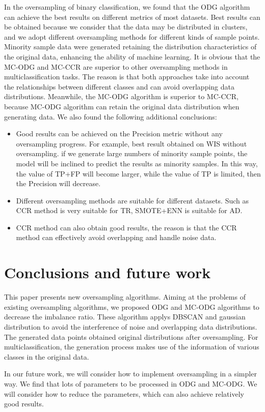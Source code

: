 \documentclass[ida]{iosart2x}
\begin{document}
In the oversampling of binary classification, 
we found that the ODG algorithm can achieve the best 
results on different metrics of most datasets.
Best results can be obtained because we consider 
that the data may be distributed in clusters, 
and we adopt different oversampling methods for different kinds of sample points.
Minority sample data were generated retaining 
the distribution characteristics of the original data, 
enhancing the ability of machine learning.
It is obvious that the MC-ODG and MC-CCR are superior 
to other oversampling methods in  
multiclassification tasks. 
The reason is that both approaches take into account 
the relationships between different classes and
can avoid overlapping data distributions.
Meanwhile, the MC-ODG algorithm is superior to MC-CCR, because MC-ODG
algorithm can retain the original data distribution when generating data.
We also found the following additional conclusions:
\begin{itemize}
  \item Good results can be achieved on the Precision metric without any oversampling progress. 
  For example, best result obtained on WIS without oversampling.
   if we generate large numbers of minority sample points, 
   the model will be inclined to predict the results as minority samples. In this way, 
   the value of TP+FP will become larger, while the value of TP is limited, then the Precision will decrease.
  \item Different oversampling methods are suitable for different datasets. 
  Such as CCR method is very suitable for TR, SMOTE+ENN is suitable for AD.
  \item CCR method can also obtain good results, 
  the reason is that the CCR method can effectively avoid overlapping and handle noise data.
\end{itemize}

\section{Conclusions and future work}
This paper presents new oversampling algorithms.
Aiming at the problems of existing oversampling algorithms, we proposed ODG and MC-ODG algorithms
to decrease the imbalance ratio. 
These algorithm applys DBSCAN and gaussian distribution to avoid the interference of noise
and overlapping data distributions. The generated data points 
obtained original distributions after oversampling.
For multiclassification,
the generation process makes use of the 
information of various classes in the original data.

In our future work, we will consider how to implement oversampling in a simpler way.
We find that lots of parameters to be processed in ODG and MC-ODG. 
We will consider how to reduce the parameters, which can also achieve relatively good results.








\end{document}
